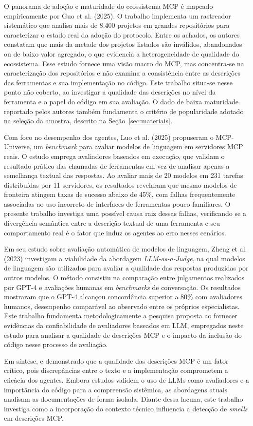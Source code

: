 O panorama de adoção e maturidade do ecossistema MCP é mapeado empiricamente por Guo et al. (2025)\nocite{guo2025measurement}. O trabalho implementa um rastreador sistemático que analisa mais de 8.400 projetos em grandes repositórios para caracterizar o estado real da adoção do protocolo. Entre os achados, os autores constatam que mais da metade dos projetos listados são inválidos, abandonados ou de baixo valor agregado, o que evidencia a heterogeneidade de qualidade do ecossistema. Esse estudo fornece uma visão macro do MCP, mas concentra-se na caracterização dos repositórios e não examina a consistência entre as descrições das ferramentas e sua implementação no código. Este trabalho situa-se nesse ponto não coberto, ao investigar a qualidade das descrições no nível da ferramenta e o papel do código em sua avaliação. O dado de baixa maturidade reportado pelos autores também fundamenta o critério de popularidade adotado na seleção da amostra, descrito na Seção~\ref{sec:materiais}.

Com foco no desempenho dos agentes, Luo et al. (2025)\nocite{2025arXiv250814704L} propuseram o MCP-Universe, um \textit{benchmark} para avaliar modelos de linguagem em servidores MCP reais. O estudo emprega avaliadores baseados em execução, que validam o resultado prático das chamadas de ferramentas em vez de analisar apenas a semelhança textual das respostas. Ao avaliar mais de 20 modelos em 231 tarefas distribuídas por 11 servidores, os resultados revelaram que mesmo modelos de fronteira atingem taxas de sucesso abaixo de 45\%, com falhas frequentemente associadas ao uso incorreto de interfaces de ferramentas pouco familiares. O presente trabalho investiga uma possível causa raiz dessas falhas, verificando se a divergência semântica entre a descrição textual de uma ferramenta e seu comportamento real é o fator que induz os agentes ao erro nesses cenários.

Em seu estudo sobre avaliação automática de modelos de linguagem, Zheng et al. (2023) \nocite{NEURIPS2023_91f18a12} investigam a viabilidade da abordagem \textit{LLM-as-a-Judge}, na qual modelos de linguagem são utilizados para avaliar a qualidade das respostas produzidas por outros modelos. O método consistiu na comparação entre julgamentos realizados por GPT-4 e avaliações humanas em \textit{benchmarks} de conversação. Os resultados mostraram que o GPT-4 alcançou concordância superior a 80\% com avaliadores humanos, desempenho comparável ao observado entre os próprios especialistas. Este trabalho fundamenta metodologicamente a pesquisa proposta ao fornecer evidências da confiabilidade de avaliadores baseados em LLM, empregados neste estudo para analisar a qualidade de descrições MCP e o impacto da inclusão do código nesse processo de avaliação.

Em síntese, e demonstrado que a qualidade das descrições MCP é um fator crítico, pois discrepâncias entre o texto e a implementação comprometem a eficácia dos agentes. Embora estudos validem o uso de LLMs como avaliadores e a importância do código para a compreensão sistêmica, as abordagens atuais analisam as documentações de forma isolada. Diante dessa lacuna, este trabalho investiga como a incorporação do contexto técnico influencia a detecção de \textit{smells} em descrições MCP.
